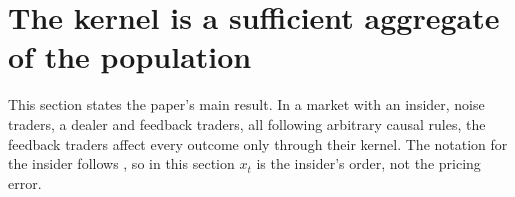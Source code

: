 \section{The kernel is a sufficient aggregate of the population}\label{sec:suff}

This section states the paper's main result. In a market with an insider, noise traders, a dealer and feedback traders, all following arbitrary causal rules, the feedback traders affect every outcome only through their kernel. The notation for the insider follows \citet{kyle1985}, so in this section $x_t$ is the insider's order, not the pricing error.

